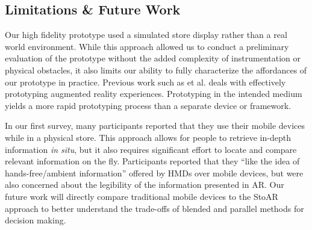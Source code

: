\subsection{Limitations \& Future Work}
Our high fidelity prototype used a simulated store display rather than a real world environment.  While this approach allowed us to conduct a preliminary evaluation of the prototype without the added complexity of instrumentation or physical obstacles, it also limits our ability to fully characterize the affordances of our prototype in practice. Previous work such as et al. \cite{macintyre2004dart} deals with effectively prototyping augmented reality experiences. Prototyping in the intended medium yields a more rapid prototyping process than a separate device or framework.

In our first survey, many participants reported that they use their mobile devices while in a physical store. This approach allows for people to retrieve in-depth information \emph{in situ}, but it also requires significant effort to locate and compare relevant information on the fly. Participants reported that they ``like the idea of hands-free/ambient information'' offered by HMDs over mobile devices, but were also concerned about the legibility of the information presented in AR. Our future work will directly compare traditional mobile devices to the StoAR approach to better understand the trade-offs of blended and parallel methods for decision making. 

